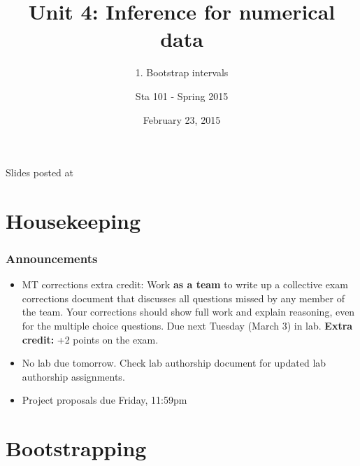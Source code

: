 \documentclass[11pt,containsverbatim,handout,xcolor=xelatex,dvipsnames,table]{beamer}
\title{Unit 4: Inference for numerical data}
\subtitle{1. Bootstrap intervals}
\author{Sta 101 - Spring 2015}
\date{February 23, 2015}
\institute{Duke University, Department of Statistical Science}
\begin{document}


\begin{frame}[plain]

\titlepage
\vfill
{\scriptsize {} \hfill Slides posted at  \webLink{\CourseSite}{\CourseSite}}
\addtocounter{framenumber}{-1} 

\end{frame}


\section{Housekeeping}


\begin{frame}
\frametitle{Announcements}

\begin{itemize}

\item MT corrections extra credit: Work \textbf{as a team} to write up a collective exam corrections document that discusses all questions missed by any member of the team. Your corrections should show full work and explain reasoning, even for the multiple choice questions. Due next Tuesday (March 3) in lab. \textbf{Extra credit:} +2 points on the exam.

\item No lab due tomorrow. Check lab authorship document for updated lab authorship assignments.

\item Project proposals due Friday, 11:59pm

\end{itemize}

\end{frame}


\section{Bootstrapping}

\end{document}
